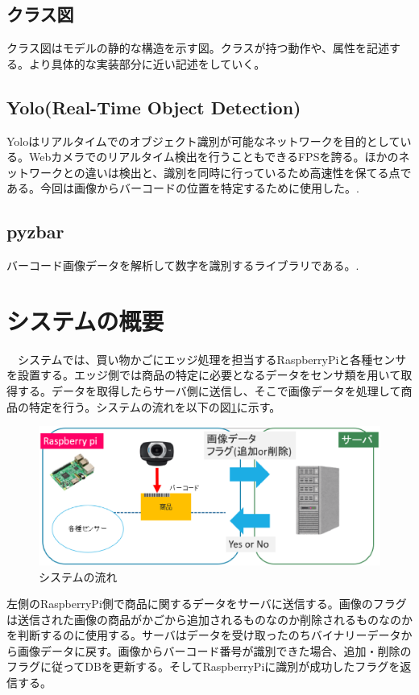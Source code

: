 \subsection*{クラス図}
クラス図はモデルの静的な構造を示す図。クラスが持つ動作や、属性を記述する。より具体的な実装部分に近い記述をしていく。

\subsection*{Yolo(Real-Time Object Detection)}
Yoloはリアルタイムでのオブジェクト識別が可能なネットワークを目的としている。Webカメラでのリアルタイム検出を行うこともできるFPSを誇る。ほかのネットワークとの違いは検出と、識別を同時に行っているため高速性を保てる点である。今回は画像からバーコードの位置を特定するために使用した。\cite{yolo}.


\subsection*{pyzbar}
バーコード画像データを解析して数字を識別するライブラリである。\cite{pyzbar}.

\section{システムの概要}
　システムでは、買い物かごにエッジ処理を担当するRaspberryPiと各種センサを設置する。エッジ側では商品の特定に必要となるデータをセンサ類を用いて取得する。データを取得したらサーバ側に送信し、そこで画像データを処理して商品の特定を行う。システムの流れを以下の図\ref{system_summary}に示す。


\begin{figure}[htbp]
\centering
\includegraphics[width=12cm]{./pic/summary.eps}
\caption{システムの流れ}
\label{system_summary}
\end{figure}

左側のRaspberryPi側で商品に関するデータをサーバに送信する。画像のフラグは送信された画像の商品がかごから追加されるものなのか削除されるものなのかを判断するのに使用する。サーバはデータを受け取ったのちバイナリーデータから画像データに戻す。画像からバーコード番号が識別できた場合、追加・削除のフラグに従ってDBを更新する。そしてRaspberryPiに識別が成功したフラグを返信する。



